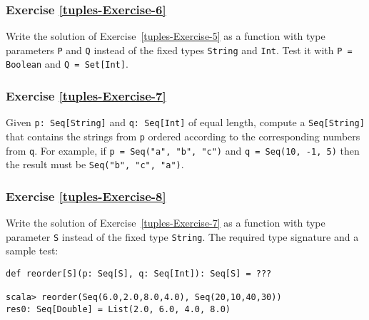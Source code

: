 \subsubsection{Exercise \label{tuples-Exercise-6}\ref{tuples-Exercise-6}}

Write the solution of Exercise~\ref{tuples-Exercise-5} as a function
with type parameters \lstinline!P!
and \lstinline!Q! instead
of the fixed types \lstinline!String!
and \lstinline!Int!. Test
it with \lstinline!P = Boolean!
and \lstinline!Q = Set[Int]!.

\subsubsection{Exercise \label{tuples-Exercise-7}\ref{tuples-Exercise-7}}

Given \lstinline!p: Seq[String]!
and \lstinline!q: Seq[Int]!
of equal length, compute a \lstinline!Seq[String]!
that contains the strings from \lstinline!p!
ordered according to the corresponding numbers from \lstinline!q!.
For example, if \lstinline!p = Seq("a", "b", "c")!
and \lstinline!q = Seq(10, -1, 5)!
then the result must be \lstinline!Seq("b", "c", "a")!.

\subsubsection{Exercise \label{tuples-Exercise-8}\ref{tuples-Exercise-8}}

Write the solution of Exercise~\ref{tuples-Exercise-7} as a function
with type parameter \lstinline!S!
instead of the fixed type \lstinline!String!.
The required type signature and a sample test:
\begin{lstlisting}
def reorder[S](p: Seq[S], q: Seq[Int]): Seq[S] = ???

scala> reorder(Seq(6.0,2.0,8.0,4.0), Seq(20,10,40,30))
res0: Seq[Double] = List(2.0, 6.0, 4.0, 8.0)
\end{lstlisting}

